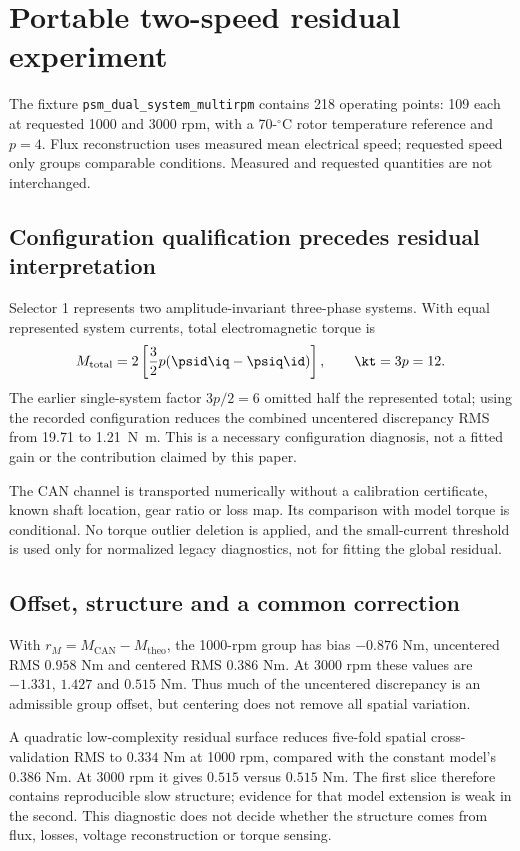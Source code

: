 \section{Portable two-speed residual experiment}
\label{sec:real-torque}
The fixture \texttt{psm\_dual\_system\_multirpm} contains 218 operating
points: 109 each at requested 1000 and 3000 rpm, with a 70-$^\circ$C rotor
temperature reference and $p=4$. Flux reconstruction uses measured mean
electrical speed; requested speed only groups comparable conditions. Measured
and requested quantities are not interchanged.

\subsection{Configuration qualification precedes residual interpretation}
Selector 1 represents two amplitude-invariant three-phase systems. With equal
represented system currents, total electromagnetic torque is
\begin{equation}
 M_{\mathrm{total}}=2\left[\frac32p(\psid\iq-\psiq\id)\right],
 \qquad \kt=3p=12.
 \label{eq:dual-system-torque}
\end{equation}
The earlier single-system factor $3p/2=6$ omitted half the represented total;
using the recorded configuration reduces the combined uncentered discrepancy
RMS from 19.71 to \SI{1.21}{\newton\metre}. This is a necessary configuration
diagnosis, not a fitted gain or the contribution claimed by this paper.

The CAN channel is transported numerically without a calibration certificate,
known shaft location, gear ratio or loss map. Its comparison with model torque
is conditional. No torque outlier deletion is applied, and the small-current
threshold is used only for normalized legacy diagnostics, not for fitting the
global residual.

\subsection{Offset, structure and a common correction}
With $r_M=M_{\mathrm{CAN}}-M_{\mathrm{theo}}$, the 1000-rpm group has bias
$-0.876$ Nm, uncentered RMS $0.958$ Nm and centered RMS $0.386$ Nm. At
3000 rpm these values are $-1.331$, $1.427$ and $0.515$ Nm. Thus much of the
uncentered discrepancy is an admissible group offset, but centering does not
remove all spatial variation.

A quadratic low-complexity residual surface reduces five-fold spatial
cross-validation RMS to $0.334$ Nm at 1000 rpm, compared with the constant
model's $0.386$ Nm. At 3000 rpm it gives $0.515$ versus $0.515$ Nm. The first
slice therefore contains reproducible slow structure; evidence for that model
extension is weak in the second. This diagnostic does not decide whether the
structure comes from flux, losses, voltage reconstruction or torque sensing.

